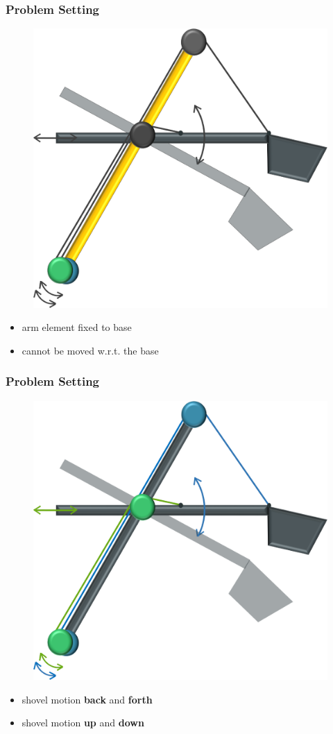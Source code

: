 \begin{frame}
	\frametitle{Problem Setting}
	\begin{figure}[bth]
		\centering
		\includegraphics[width=.4\linewidth]{img/Problem_2}
	\end{figure}
	\begin{itemize}
		\item{arm element fixed to base}
		\item{cannot be moved w.r.t. the base}
	\end{itemize}
\end{frame}

\begin{frame}
	\frametitle{Problem Setting}
	\begin{figure}[bth]
		\centering
		\includegraphics[width=.4\linewidth]{img/Problem_3}
	\end{figure}
	\centering
	\begin{itemize}
		\item{\makebox[1cm][l]{\textcolor[rgb]{0,0.69,0.32}{green}} shovel motion \textbf{back} and \textbf{forth}}
		\item{\makebox[1cm][l]{\textcolor[rgb]{0.18,0.46,0.71}{blue}} shovel motion \textbf{up} and \textbf{down}} \\
	\end{itemize}
\end{frame}

